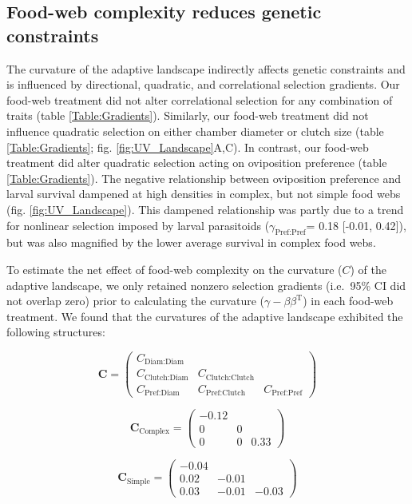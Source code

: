 \documentclass[11pt,]{article}
\begin{document}
\subsection{Food-web complexity reduces genetic
constraints}\label{food-web-complexity-reduces-genetic-constraints}

\indent The curvature of the adaptive landscape indirectly affects
genetic constraints and is influenced by directional, quadratic, and
correlational selection gradients. Our food-web treatment did not alter
correlational selection for any combination of traits (table
\ref{Table:Gradients}). Similarly, our food-web treatment did not
influence quadratic selection on either chamber diameter or clutch size
(table \ref{Table:Gradients}; fig. \ref{fig:UV_Landscape}A,C). In
contrast, our food-web treatment did alter quadratic selection acting on
oviposition preference (table \ref{Table:Gradients}). The negative
relationship between oviposition preference and larval survival dampened
at high densities in complex, but not simple food webs (fig.
\ref{fig:UV_Landscape}). This dampened relationship was partly due to a
trend for nonlinear selection imposed by larval parasitoids
(\(\gamma_{\text{Pref:Pref}}\)= 0.18 {[}-0.01, 0.42{]}), but was also
magnified by the lower average survival in complex food webs.

To estimate the net effect of food-web complexity on the curvature
(\(C\)) of the adaptive landscape, we only retained nonzero selection
gradients (i.e.~95\% CI did not overlap zero) prior to calculating the
curvature (\(\gamma - \beta \beta^\text{T}\)) in each food-web
treatment. We found that the curvatures of the adaptive landscape
exhibited the following structures:

\[\textbf{C} = \begin{pmatrix} C_{\text{Diam:Diam}}&& \\ C_{\text{Clutch:Diam}} & C_{\text{Clutch:Clutch}} & \\ C_{\text{Pref:Diam}} & C_{\text{Pref:Clutch}} & C_{\text{Pref:Pref}} \end{pmatrix}\]

\[\textbf{C}_{\text{Complex}} = \begin{pmatrix} 
-0.12 &  &  \\  
0 & 0 &  \\  
0 & 0 & 0.33 \end{pmatrix}\]

\[\textbf{C}_{\text{Simple}} = \begin{pmatrix} 
-0.04 &  &  \\  
0.02 & -0.01 &  \\  
0.03 & -0.01 & -0.03 \end{pmatrix}\]
\end{document}
